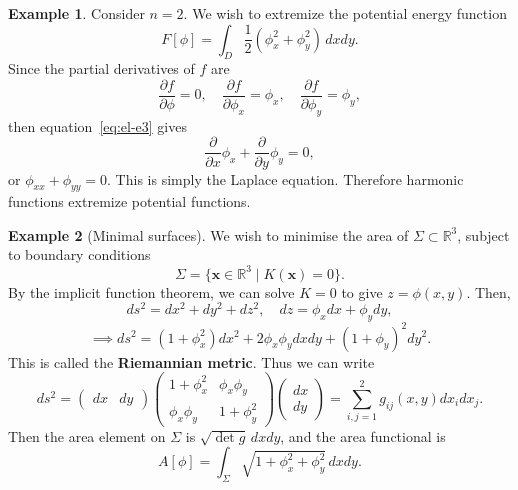 \documentclass[12pt]{article}
\theoremstyle{definition}
\newtheorem{example}{Example}[section]
\theoremstyle{remark}
\begin{document}
\begin{adjustbox}{minipage = \columnwidth - 25.5pt, margin=1em, frame=1pt, margin=0em}
\begin{example}
	Consider $n = 2$. We wish to extremize the potential energy function
	\[
		F[\phi] = \int_{D} \frac{1}{2} (\phi_{x}^2 + \phi_{y}^2) \, dxdy
	.\]
	Since the partial derivatives of $f$ are
	\[
	\frac{\partial f}{\partial \phi} = 0, \quad \frac{\partial f}{\partial \phi_x} = \phi_x, \quad \frac{\partial f}{\partial \phi_y} = \phi_y
	,\]
	then equation~\eqref{eq:el-e3} gives
	\[
	\frac{\partial}{\partial x} \phi_x + \frac{\partial}{\partial y} \phi_y = 0
	,\]
	or $\phi_{xx} + \phi_{yy} = 0$. This is simply the Laplace equation. Therefore harmonic functions extremize potential functions.
\end{example}

\end{adjustbox}

\begin{adjustbox}{minipage = \columnwidth - 25.5pt, margin=1em, frame=1pt, margin=0em}
	\begin{example}[Minimal surfaces]
	We wish to minimise the area of $\Sigma \subset \mathbb{R}^3$, subject to boundary conditions
	\[
		\Sigma = \{ \mathbf{x} \in \mathbb{R}^3 \mid K(\mathbf{x}) = 0 \}
	.\]
	By the implicit function theorem, we can solve $K = 0$ to give $z = \phi(x, y)$. Then,
	\[
	ds^2 = dx^2 + dy^2 + dz^2, \quad dz = \phi_x dx + \phi_y dy,
	\]
	\[
		\implies ds^2 = (1 + \phi_x^2)dx^2 + 2\phi_x\phi_y dxdy + (1 + \phi_y)^2 dy^2
	.\]
	This is called the \textbf{Riemannian metric}. Thus we can write
	\[
	ds^2 = 
	\begin{pmatrix}
		dx & dy
	\end{pmatrix}
	\begin{pmatrix}
		1 + \phi_x^2 & \phi_x \phi_y \\
		\phi_x\phi_y & 1 + \phi_y^2
	\end{pmatrix}
	\begin{pmatrix}
		dx \\
		dy
	\end{pmatrix} = \sum_{i,j = 1}^{2} g_{ij}(x, y) dx_i dx_j
	.\]
	Then the area element on $\Sigma$ is $\sqrt{\det g}\, dxdy$, and the area functional is
	\[
		A[\phi] = \int_{\Sigma}\sqrt{1 + \phi_x^2 + \phi_y^2}\, dxdy
	.\]
\end{example}

\end{adjustbox}
\end{document}
